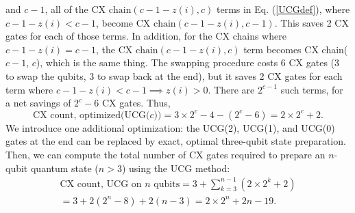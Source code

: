 and $c - 1$, all of the $\text{CX chain}(c - 1 - z(i), c)$ terms in 
Eq. (\ref{UCGdef}), where $c - 1 - z(i) < c - 1$, become 
$\text{CX chain}(c - 1 - z(i), c - 1)$. This saves 2 CX gates for each of those
terms. In addition, for the CX chains where $c - 1 - z(i) = c - 1$, the 
$\text{CX chain}(c - 1 - z(i), c)$ term becomes CX chain($c - 1$, $c$), which is
the same thing. The swapping procedure costs 6 CX gates (3 to swap the qubits, 3
to swap back at the end), but it saves 2 CX gates for each term where 
$c - 1 - z(i) < c - 1 \implies z(i) > 0$. There are $2^{c - 1}$ such terms, for
a net savings of $2^c - 6$ CX gates. Thus,
\begin{equation}
\text{CX count, optimized(UCG($c$))} = 3 \times 2^c - 4 - (2^c - 6) 
  = 2 \times 2^c + 2.
\end{equation}
We introduce one additional optimization: the UCG(2), UCG(1), and UCG(0) gates
at the end can be replaced by exact, optimal three-qubit state preparation. Then,
we can compute the total number of CX gates required to prepare an $n$-qubit
quantum state ($n > 3$) using the UCG method:
\begin{align}
\text{CX count, UCG on $n$ qubits} = 3 + \sum_{k = 3}^{n - 1}{(2 \times 2^k + 2)}
\nonumber \\
= 3 + 2(2^n - 8) + 2(n - 3) = 2 \times 2^n + 2n - 19.
\end{align}


